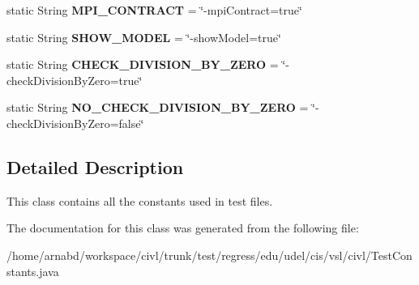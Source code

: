 \begin{DoxyCompactItemize}
\item 
\hypertarget{classedu_1_1udel_1_1cis_1_1vsl_1_1civl_1_1TestConstants_a9f46447c0458abd56fd75b37f8c4abe4}{}static String {\bfseries M\+P\+I\+\_\+\+C\+O\+N\+T\+R\+A\+C\+T} = \char`\"{}-\/mpi\+Contract=true\char`\"{}\label{classedu_1_1udel_1_1cis_1_1vsl_1_1civl_1_1TestConstants_a9f46447c0458abd56fd75b37f8c4abe4}

\item 
\hypertarget{classedu_1_1udel_1_1cis_1_1vsl_1_1civl_1_1TestConstants_aa462172a633ebc4e7e2c12bfaa000653}{}static String {\bfseries S\+H\+O\+W\+\_\+\+M\+O\+D\+E\+L} = \char`\"{}-\/show\+Model=true\char`\"{}\label{classedu_1_1udel_1_1cis_1_1vsl_1_1civl_1_1TestConstants_aa462172a633ebc4e7e2c12bfaa000653}

\item 
\hypertarget{classedu_1_1udel_1_1cis_1_1vsl_1_1civl_1_1TestConstants_a1025c81067c8dad984e74a91add8ded4}{}static String {\bfseries C\+H\+E\+C\+K\+\_\+\+D\+I\+V\+I\+S\+I\+O\+N\+\_\+\+B\+Y\+\_\+\+Z\+E\+R\+O} = \char`\"{}-\/check\+Division\+By\+Zero=true\char`\"{}\label{classedu_1_1udel_1_1cis_1_1vsl_1_1civl_1_1TestConstants_a1025c81067c8dad984e74a91add8ded4}

\item 
\hypertarget{classedu_1_1udel_1_1cis_1_1vsl_1_1civl_1_1TestConstants_a72c645373907e7c476a69fdfe3d9e969}{}static String {\bfseries N\+O\+\_\+\+C\+H\+E\+C\+K\+\_\+\+D\+I\+V\+I\+S\+I\+O\+N\+\_\+\+B\+Y\+\_\+\+Z\+E\+R\+O} = \char`\"{}-\/check\+Division\+By\+Zero=false\char`\"{}\label{classedu_1_1udel_1_1cis_1_1vsl_1_1civl_1_1TestConstants_a72c645373907e7c476a69fdfe3d9e969}

\end{DoxyCompactItemize}


\subsection{Detailed Description}
This class contains all the constants used in test files. 



The documentation for this class was generated from the following file\+:\begin{DoxyCompactItemize}
\item 
/home/arnabd/workspace/civl/trunk/test/regress/edu/udel/cis/vsl/civl/Test\+Constants.\+java\end{DoxyCompactItemize}
